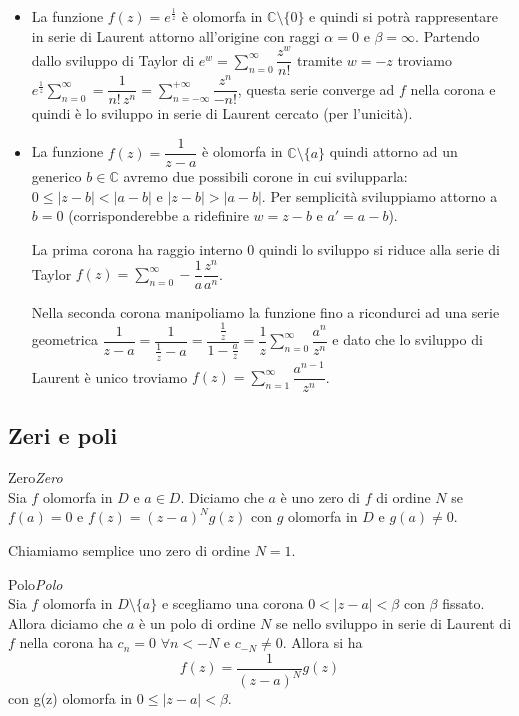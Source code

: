 \documentclass[11pt,a4paper,twoside]{book}
\newenvironment{definizione}[1][\empty]{\begin{Definizione}{
\ifx\empty#1\relax\else\mdseries\itshape#1\\\fi
}{}}{\end{Definizione}}
\newenvironment{esempio}[1][Esempio]{ 
  \begin{center}\begin{tcolorbox}[
  title={#1:~},
  width=0.9\linewidth,
  flush right,
  enhanced jigsaw, 
  colback=white, 
  frame hidden, 
  sharpish corners, arc=3mm,
  borderline west = {1pt}{0pt}{gray},
  borderline south = {1pt}{0pt}{gray},
  coltitle=black, 
  fonttitle=\small\bfseries, 
  attach title to upper, 
  breakable,
  top=2.5pt, bottom=0.3pt]\small
  }{
 \normalsize \end{tcolorbox}\end{center}
}
\theoremstyle{esss}
\theoremstyle{dotless}
\numberwithin{equation}{section} %
\begin{document}
\begin{esempio}
\begin{itemize}[label=$\cdot$]
\item La funzione $f(z)=e^{\frac{1}{z}}$ è olomorfa in $\mathbb{C}\setminus\{0\}$ e quindi si potrà rappresentare in serie di Laurent attorno all'origine con raggi $\alpha=0$ e $\beta=\infty$. Partendo dallo sviluppo di Taylor di $e^w=\sum_{n=0}^\infty \dfrac{z^w}{n!}$ tramite $w=-z$ troviamo $e^{\frac{1}{z}}\sum_{n=0}^\infty=\dfrac{1}{n!\, z^n}=\sum_{n=-\infty}^{+\infty} \dfrac{z^n}{-n!}$, questa serie converge ad $f$ nella corona e quindi è lo sviluppo in serie di Laurent cercato (per l'unicità).


\item La funzione $f(z)=\dfrac{1}{z-a}$ è olomorfa in $\mathbb{C}\setminus\{a\}$ quindi attorno ad un generico $b\in\mathbb{C}$ avremo due possibili corone in cui svilupparla: $0\leq|z-b|<|a-b|$ e $|z-b|>|a-b|$. Per semplicità sviluppiamo attorno a $b=0$ (corrisponderebbe a ridefinire $w=z-b$ e $a'=a-b$).

La prima corona ha raggio interno $0$ quindi lo sviluppo si riduce alla serie di Taylor $f(z)=\sum_{n=0}^\infty -\dfrac{1}{a} \dfrac{z^n}{a^n}$.

Nella seconda corona manipoliamo la funzione fino a ricondurci ad una serie geometrica $\dfrac{1}{z-a}=\dfrac{1}{\frac{1}{z}-a}=\dfrac{\frac{1}{z}}{1-\frac{a}{z}}=\dfrac{1}{z}\sum_{n=0}^\infty \dfrac{a^n}{z^n}$ e dato che lo sviluppo di Laurent è unico troviamo $f(z)=\sum_{n=1}^\infty \dfrac{a^{n-1}}{z^n}$.
\end{itemize}
\end{esempio}


\subsection{Zeri e poli}

\begin{definizione}[Zero]
Sia $f$ olomorfa in $D$ e $a\in D$. Diciamo che $a$ è uno zero di $f$ di ordine $N$ se $f(a)=0$ e $f(z)=(z-a)^Ng(z)$ con $g$ olomorfa in $D$ e $g(a)\neq0$.\end{definizione}

Chiamiamo semplice uno zero di ordine $N=1$.

\begin{definizione}[Polo]
Sia $f$ olomorfa in $D\setminus\{a\}$ e scegliamo una corona $0<|z-a|<\beta$ con $\beta$ fissato. Allora diciamo che $a$ è un polo di ordine $N$ se nello sviluppo in serie di Laurent di $f$ nella corona ha $c_n=0$ $\forall n<-N$ e $c_{-N}\neq0$. Allora si ha 
\[
f(z)=\dfrac{1}{(z-a)^N}g(z)
\]
con g(z) olomorfa in $0\leq|z-a|<\beta$.
\end{definizione}
\end{document}
